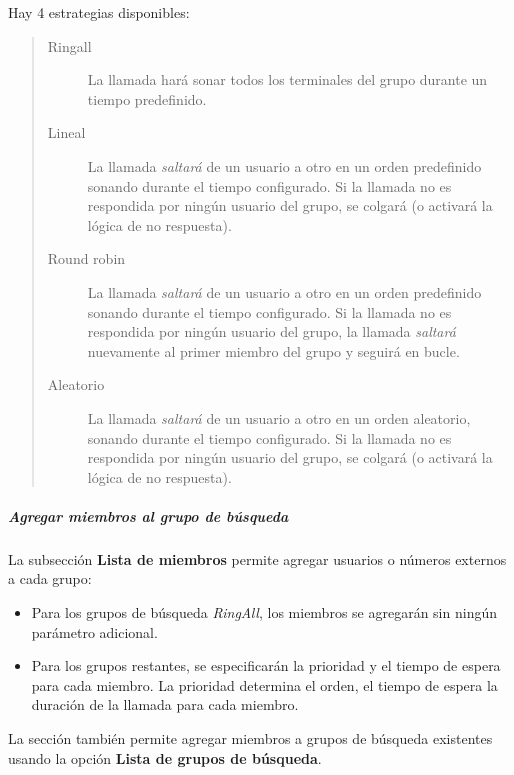 \documentclass[letterpaper,10pt,spanish]{sphinxmanual}
\begin{document}
Hay 4 estrategias disponibles:
\begin{quote}
\begin{description}
\item[{Ringall}] \leavevmode
La llamada hará sonar todos los terminales del grupo durante un tiempo predefinido.

\item[{Lineal}] \leavevmode
La llamada \emph{saltará} de un usuario a otro en un orden predefinido sonando durante el tiempo configurado. Si la llamada no es respondida por ningún usuario del grupo, se colgará (o activará la lógica de no respuesta).

\item[{Round robin}] \leavevmode
La llamada \emph{saltará} de un usuario a otro en un orden predefinido sonando durante el tiempo configurado. Si la llamada no es respondida por ningún usuario del grupo, la llamada \emph{saltará} nuevamente al primer miembro del grupo y seguirá en bucle.

\item[{Aleatorio}] \leavevmode
La llamada \emph{saltará} de un usuario a otro en un orden aleatorio, sonando durante el tiempo configurado. Si la llamada no es respondida por ningún usuario del grupo, se colgará (o activará la lógica de no respuesta).

\end{description}
\end{quote}


\subparagraph{Agregar miembros al grupo de búsqueda}
\label{administration_portal/client/vpbx/routing_endpoints/hunt_groups:adding-members-to-hunt-group}
La subsección \textbf{Lista de miembros} permite agregar usuarios o números externos a cada grupo:
\begin{itemize}
\item {} 
Para los grupos de búsqueda \emph{RingAll}, los miembros se agregarán sin ningún parámetro adicional.

\item {} 
Para los grupos restantes, se especificarán la prioridad y el tiempo de espera para cada miembro. La prioridad determina el orden, el tiempo de espera la duración de la llamada para cada miembro.

\end{itemize}

La sección {\hyperref[administration_portal/client/vpbx/users:users]{}} también permite agregar miembros a grupos de búsqueda existentes usando la opción \textbf{Lista de grupos de búsqueda}.
\end{document}
